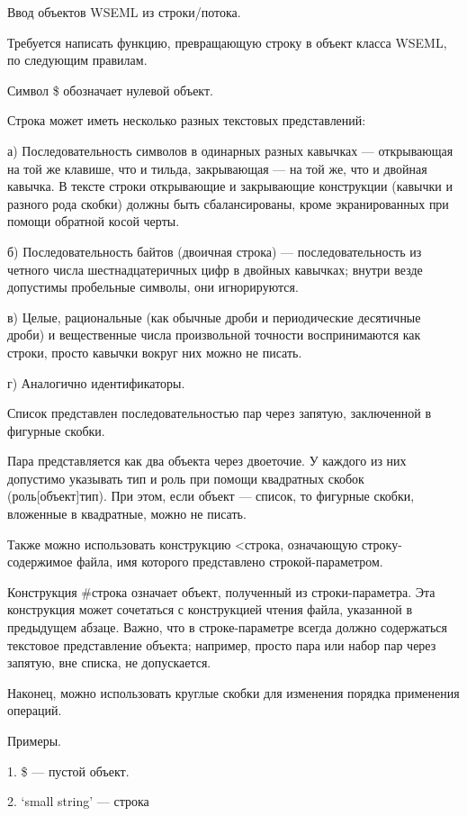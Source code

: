\documentclass{report}
\begin{document}
    Ввод объектов WSEML из строки/потока.

    Требуется написать функцию, превращающую строку в объект класса WSEML, по следующим правилам.

    Символ \$ обозначает нулевой объект.

    Строка может иметь несколько разных текстовых представлений:

    а) Последовательность символов в одинарных разных кавычках --- открывающая на той же клавише, что и тильда, закрывающая --- на той же, что и двойная кавычка. В тексте строки открывающие и закрывающие конструкции (кавычки и разного рода скобки) должны быть сбалансированы, кроме экранированных при помощи обратной косой черты.

    б) Последовательность байтов (двоичная строка) --- последовательность из четного числа шестнадцатеричных цифр в двойных кавычках; внутри везде допустимы пробельные символы, они игнорируются.

    в) Целые, рациональные (как обычные дроби и периодические десятичные дроби) и вещественные числа произвольной точности воспринимаются как строки, просто кавычки вокруг них можно не писать.

    г) Аналогично идентификаторы.

    Список представлен последовательностью пар через запятую, заключенной в фигурные скобки.

    Пара представляется как два объекта через двоеточие. У каждого из них допустимо указывать тип и роль при помощи квадратных скобок (роль[объект]тип). При этом, если объект --- список, то фигурные скобки, вложенные в квадратные, можно не писать.

    Также можно использовать конструкцию <строка, означающую строку-содержимое файла, имя которого представлено строкой-параметром.

    Конструкция \#строка означает объект, полученный из строки-параметра. Эта конструкция может сочетаться с конструкцией чтения файла, указанной в предыдущем абзаце. Важно, что в строке-параметре всегда должно содержаться текстовое представление объекта; например, просто пара или набор пар через запятую, вне списка, не допускается.

    Наконец, можно использовать круглые скобки для изменения порядка применения операций.

    Примеры.

    1. \$ --- пустой объект.

    2. `small string' --- строка
\end{document}
